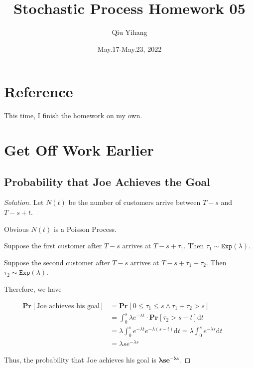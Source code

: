 \documentclass{article}
\title{\textbf{Stochastic Process Homework 05}}
\author{Qiu Yihang}
\date{May.17-May.23, 2022}
\renewcommand{\Pr}[2]{\mathbf{Pr}_{#1}\left[#2\right]}
\newenvironment{solution}{\begin{proof}[\noindent\it Solution]}{\end{proof}}
\begin{document}
\maketitle

\setcounter{section}{-1}
\section{Reference}

\hspace{2em}
This time, I finish the homework on my own.

\vspace{1em}
\section{Get Off Work Earlier}
\vspace{1em}

\subsection{Probability that Joe Achieves the Goal}
\vspace{1em}
\begin{solution}
    Let $N(t)$ be the number of customers arrive between $T-s$ and $T-s+t$. 
    
    \hspace{2.6em}
    Obvious $N(t)$ is a Poisson Process.
    
    \hspace{2.6em}
    Suppose the first customer after $T-s$ arrives at $T-s+\tau_1$. Then $\tau_1\sim\mathtt{Exp}(\lambda)$.
    
    \hspace{2.6em}
    Suppose the second customer after $T-s$ arrives at $T-s+\tau_1+\tau_2$. Then $\tau_2\sim\mathtt{Exp}(\lambda)$.
    
    \hspace{2.6em}
    Therefore, we have
    
    \vspace{-3em}
    \begin{align*}
        \Pr{}{\text{Joe achieves his goal}}&=\Pr{}{0\le\tau_1\le s\land \tau_1+\tau_2>s} \\
        &=\int_{0}^{s}\lambda e^{-\lambda t}\cdot\Pr{}{\tau_2>s-t} \mathrm{d}t\\
        &=\lambda\int_{0}^{s} e^{-\lambda t}e^{-\lambda(s-t)}\mathrm{d}t =\lambda\int_0^s e^{-\lambda s} \mathrm{d}t \qquad \\
        &= \lambda s e^{-\lambda s}
    \end{align*}
    
    \vspace{-0.75em} \hspace{2.6em}
    Thus, the probability that Joe achieves his goal is \underline{$\boldsymbol{\lambda s e^{-\lambda s}}$}.
\end{solution}
\end{document}
